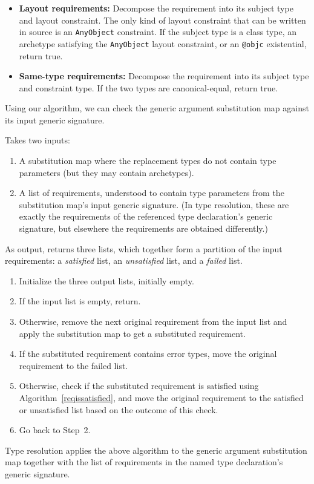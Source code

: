 \documentclass[../generics]{subfiles}
\begin{document}
\begin{algorithm}
\begin{itemize}
\begin{enumerate}
\end{enumerate}
\item \textbf{Layout requirements:} Decompose the requirement into its subject type and layout constraint. The only kind of layout constraint that can be written in source is an \texttt{AnyObject} constraint. If the subject type is a class type, an archetype satisfying the \texttt{AnyObject} layout constraint, or an \texttt{@objc} existential, return true.
\item \textbf{Same-type requirements:} Decompose the requirement into its subject type and constraint type. If the two types are canonical-equal, return true.
\end{itemize}
\end{algorithm}

Using our algorithm, we can check the generic argument substitution map against its input generic signature.
\begin{algorithm}\label{check generic arguments algorithm}
Takes two inputs:
\begin{enumerate}
\item A substitution map where the replacement types do not contain type parameters (but they may contain archetypes).
\item A list of requirements, understood to contain type parameters from the substitution map's input generic signature. (In type resolution, these are exactly the requirements of the referenced type declaration's generic signature, but elsewhere the requirements are obtained differently.)
\end{enumerate}
As output, returns three lists, which together form a partition of the input requirements: a \emph{satisfied} list, an \emph{unsatisfied} list, and a \emph{failed} list.
\begin{enumerate}
\item Initialize the three output lists, initially empty.
\item If the input list is empty, return.
\item Otherwise, remove the next original requirement from the input list and apply the substitution map to get a substituted requirement.
\item If the substituted requirement contains error types, move the original requirement to the failed list.
\item Otherwise, check if the substituted requirement is satisfied using Algorithm~\ref{reqissatisfied}, and move the original requirement to the satisfied or unsatisfied list based on the outcome of this check.
\item Go back to Step~2.
\end{enumerate}
\end{algorithm}
Type resolution applies the above algorithm to the generic argument substitution map together with the list of requirements in the named type declaration's generic signature.
\end{document}
